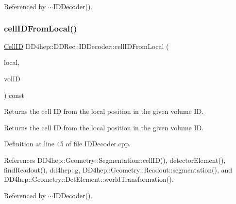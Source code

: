 Referenced by $\sim$\+I\+D\+Decoder().

\hypertarget{class_d_d4hep_1_1_d_d_rec_1_1_i_d_decoder_a5c5b80ae11b27ff5ef9b639b128f9f60}{}\label{class_d_d4hep_1_1_d_d_rec_1_1_i_d_decoder_a5c5b80ae11b27ff5ef9b639b128f9f60} 
\subsubsection{\texorpdfstring{cell\+I\+D\+From\+Local()}{cellIDFromLocal()}}
{\footnotesize\ttfamily \hyperlink{namespace_d_d4hep_1_1_d_d_rec_af5cecc2e566eeaedb430b92df23971d4}{Cell\+ID} D\+D4hep\+::\+D\+D\+Rec\+::\+I\+D\+Decoder\+::cell\+I\+D\+From\+Local (\begin{DoxyParamCaption}\item[{const \hyperlink{namespace_d_d4hep_1_1_geometry_a55083902099d03506c6db01b80404900}{Geometry\+::\+Position} \&}]{local,  }\item[{const \hyperlink{namespace_d_d4hep_1_1_d_d_rec_a5b5fea15b3678944e1aba487a746bdcb}{Volume\+ID}}]{vol\+ID }\end{DoxyParamCaption}) const}



Returns the cell ID from the local position in the given volume ID. 

Returns the cell ID from the local position in the given volume ID. 

Definition at line 45 of file I\+D\+Decoder.\+cpp.



References D\+D4hep\+::\+Geometry\+::\+Segmentation\+::cell\+I\+D(), detector\+Element(), find\+Readout(), dd4hep\+::g, D\+D4hep\+::\+Geometry\+::\+Readout\+::segmentation(), and D\+D4hep\+::\+Geometry\+::\+Det\+Element\+::world\+Transformation().



Referenced by $\sim$\+I\+D\+Decoder().

\hypertarget{class_d_d4hep_1_1_d_d_rec_1_1_i_d_decoder_ac6cf13ecf33d0e62b6871eaa134c6ccb}{}\label{class_d_d4hep_1_1_d_d_rec_1_1_i_d_decoder_ac6cf13ecf33d0e62b6871eaa134c6ccb} 
